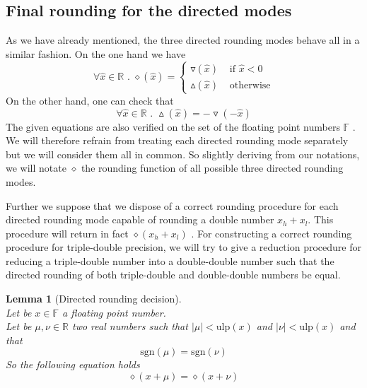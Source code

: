 \documentclass[a4paper,10pt,twoside]{article}
\newtheorem{lemma}[theorem]{Lemma}
\newcommand{\F}{\ensuremath{\mathbb {F}}}
\newcommand{\R}{\ensuremath{\mathbb {R}}}
\newcommand{\hi}{\ensuremath{\mathit{h}}}
\newcommand{\lo}{\ensuremath{\mathit{l}}}
\newcommand{\mUlp}{\ensuremath{\mathrm{ulp}}}
\newcommand{\sgn}{\ensuremath{\mathrm{sgn}}}
\begin{document}
\subsection{Final rounding for the directed modes}
As we have already mentioned, the three directed rounding modes behave all in a similar fashion. On the one hand
we have 
$$\forall \hat{x} \in \R \mbox{ . } \diamond \left( \hat{x} \right) = \left \lbrace 
\begin{array}{ll}
\triangledown \left( \hat{x} \right) & \mbox{ if } \hat{x} < 0 \\
\vartriangle \left( \hat{x} \right) & \mbox{ otherwise}
\end{array} \right. $$
On the other hand, one can check that 
$$\forall \hat{x} \in \R \mbox{ . } \vartriangle \left( \hat{x} \right) = - \triangledown \left( - \hat{x} \right)$$
The given equations are also verified on the set of the floating point numbers $\F$ \cite{Defour-thesis, IEEE754}. 
We will therefore refrain from treating each directed rounding mode separately but we will consider them all in 
common. So slightly deriving from our notations, we will notate $\diamond$ the rounding function of all possible three
directed rounding modes.\par
Further we suppose that we dispose of a correct rounding procedure for each directed rounding mode capable
of rounding a double number $x_\hi + x_\lo$. This procedure will return in fact $\diamond \left( x_\hi + x_\lo \right)$
\cite{crlibmweb, Defour-thesis}. 
For constructing a correct rounding procedure for triple-double precision, we will try to give a reduction 
procedure for reducing a triple-double number into a double-double number such that the directed 
rounding of both triple-double and double-double numbers be equal. 
\begin{lemma}[Directed rounding decision] \label{decarrdir} ~ \\
Let be $x \in \F$ a floating point number. \\
Let be $\mu, \nu \in \R$ two real numbers such that $\left \vert \mu \right \vert < \mUlp\left( x \right)$ and
$\left \vert \nu \right \vert < \mUlp\left( x \right)$  and that
$$\sgn\left( \mu \right) = \sgn\left( \nu \right)$$
So the following equation holds
$$\diamond \left( x + \mu \right) = \diamond\left( x + \nu \right)$$
\end{lemma}
\end{document}
